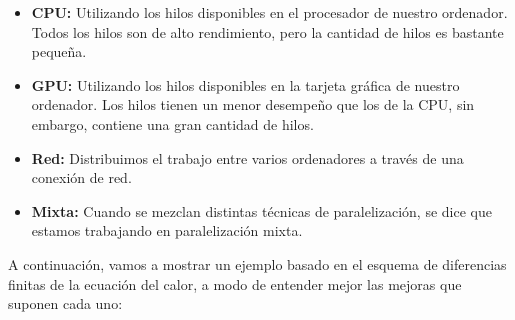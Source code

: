 \begin{itemize}
	\item \textbf{CPU:} Utilizando los hilos disponibles en el procesador de nuestro ordenador. Todos los hilos son de alto rendimiento, pero la cantidad de hilos es bastante pequeña.

	\item \textbf{GPU:} Utilizando los hilos disponibles en la tarjeta gráfica de nuestro\\ ordenador. Los hilos tienen un menor desempeño que los de la CPU, sin embargo, contiene una gran cantidad de hilos.
	 
	\item \textbf{Red:} Distribuimos el trabajo entre varios ordenadores a través de una conexión de red.
	
	\item \textbf{Mixta: } Cuando se mezclan distintas técnicas de paralelización, se dice que estamos trabajando en paralelización mixta.
\end{itemize}

A continuación, vamos a mostrar un ejemplo basado en el esquema de diferencias finitas de la ecuación del calor, a modo de entender mejor las mejoras que suponen cada uno:

